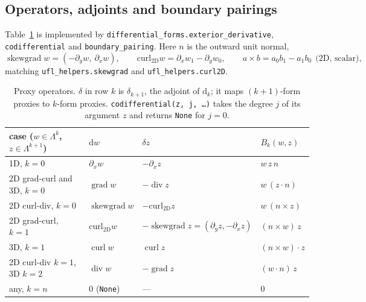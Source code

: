 \documentclass[11pt]{article}
\newcommand{\dd}{\mathrm{d}}
\newcommand{\cod}{\delta}
\newcommand{\curltwo}{\operatorname{curl_{2D}}}
\newcommand{\skewgrad}{\operatorname{skewgrad}}
\newcommand{\grad}{\operatorname{grad}}
\newcommand{\curl}{\operatorname{curl}}
\renewcommand{\div}{\operatorname{div}}
\newcommand{\code}[1]{\texttt{#1}}
\theoremstyle{remark}
\begin{document}
\subsection{Operators, adjoints and boundary pairings}

Table~\ref{tab:operators} is implemented by \code{differential\_forms.exterior\_derivative},
\code{codifferential} and \code{boundary\_pairing}. Here $n$ is the outward unit normal,
\[
  \skewgrad w = (-\partial_y w,\ \partial_x w),\qquad
  \curltwo w = \partial_x w_1 - \partial_y w_0,\qquad
  a\times b = a_0 b_1 - a_1 b_0\ \ \text{(2D, scalar)},
\]
matching \code{ufl\_helpers.skewgrad} and \code{ufl\_helpers.curl2D}.

\begin{table}[h]
\centering
\renewcommand{\arraystretch}{1.25}
\begin{tabular}{@{}llll@{}}
\toprule
case ($w\in\Lambda^k$, $z\in\Lambda^{k+1}$) & $\dd w$ & $\cod z$ & $B_k(w,z)$\\
\midrule
1D, $k=0$                         & $\partial_x w$   & $-\partial_x z$                       & $w\,z\,n$\\
2D grad-curl and 3D, $k=0$        & $\grad w$        & $-\div z$                             & $w\,(z\cdot n)$\\
2D curl-div, $k=0$                & $\skewgrad w$    & $-\curltwo z$                         & $w\,(n\times z)$\\
2D grad-curl, $k=1$               & $\curltwo w$     & $-\skewgrad z=(\partial_y z,-\partial_x z)$ & $(n\times w)\,z$\\
3D, $k=1$                         & $\curl w$        & $\curl z$                             & $(n\times w)\cdot z$\\
2D curl-div $k=1$, 3D $k=2$       & $\div w$         & $-\grad z$                            & $(w\cdot n)\,z$\\
any, $k=n$                        & $0$ (\code{None}) & ---                                  & $0$\\
\bottomrule
\end{tabular}
\caption{Proxy operators. $\cod$ in row $k$ is $\cod_{k+1}$, the adjoint of $\dd_k$; it maps
$(k+1)$-form proxies to $k$-form proxies. \code{codifferential(z, j, \dots)} takes the degree
$j$ of its argument $z$ and returns \code{None} for $j=0$.}
\label{tab:operators}
\end{table}
\end{document}
